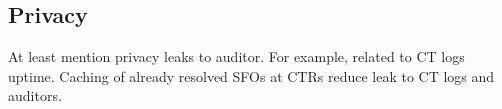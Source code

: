 %
%
%
%
%
%
%
%

\subsection{Privacy}
At least mention privacy leaks to auditor. For example, related to CT logs
uptime. Caching of already resolved SFOs at CTRs reduce leak to CT logs and
auditors.

